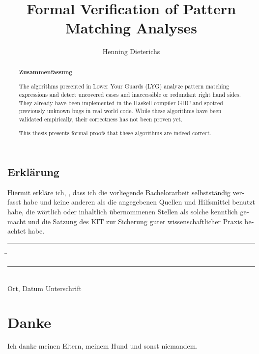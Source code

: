 \documentclass[parskip=no,12pt,a4paper,twoside,headings=openright]{scrreprt}
\title{Formal Verification of Pattern Matching Analyses}
\author{Henning Dieterichs}
\begin{document}
\begin{otherlanguage}{ngerman} %
	\mytitlepage
\end{otherlanguage}

\begin{abstract}
	\begin{center}\Huge\textbf{\textsf{Zusammenfassung}}
	\end{center}
	\vfill


	\vfill

	The algorithms presented in Lower Your Guards (LYG) analyze pattern matching expressions and detect uncovered cases and inaccessible or redundant right hand sides.
	They already have been implemented in the Haskell compiler GHC and spotted previously unknown bugs in real world code.
	While these algorithms have been validated empirically, their correctness has not been proven yet.

	This thesis presents formal proofs that these algorithms are indeed correct.
	\vfill


\end{abstract}

\tableofcontents











\begin{otherlanguage}{ngerman}
	\chapter*{Erklärung}
	\pagestyle{empty}

	\vspace{20mm}
	Hiermit erkläre ich, \theauthor, dass ich die vorliegende Bachelorarbeit selbst\-ständig
	verfasst habe und keine anderen als die angegebenen Quellen und Hilfsmittel
	benutzt habe, die wörtlich oder inhaltlich übernommenen Stellen als solche kenntlich gemacht und
	die Satzung des KIT zur Sicherung guter wissenschaftlicher Praxis beachtet habe.
	\vspace{20mm}
	\begin{tabbing}
		\rule{7cm}{.4pt}\hspace{1cm} \= \rule{6.8cm}{.4pt} \\
		Ort, Datum \> Unterschrift
	\end{tabbing}
\end{otherlanguage}

\chapter*{Danke}
\pagestyle{empty}

Ich danke meinen Eltern, meinem Hund und sonst niemandem.

\pagestyle{fancy}
\end{document}
